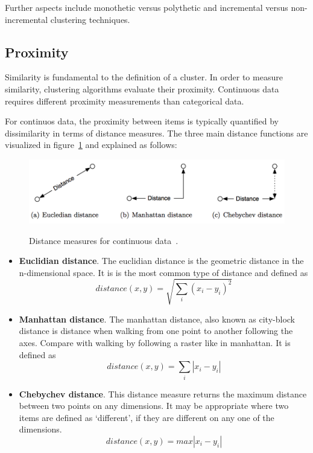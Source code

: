 Further aspects include monothetic versus polythetic and incremental versus non-incremental clustering techniques. 



\subsection{Proximity}
\label{chapter:proximity}

Similarity is fundamental to the definition of a cluster. In order to measure similarity, clustering algorithms evaluate their proximity. Continuous data requires different proximity measurements than categorical data.

For continuos data, the proximity between items is typically quantified by dissimilarity in terms of distance measures. The three main distance functions are visualized in figure~\ref{fig:distance} and explained as follows\cite{Meert06clustermaps}:

\begin{figure}[h]
  \begin{center}
    \includegraphics[width=1\textwidth]{figures/distance.png}
    \label{fig:distance}
    \caption{Distance measures for continuous data~\cite[p 12]{Meert06clustermaps}.}
  \end{center}
\end{figure}

\begin{itemize}

\item \textbf{Euclidian distance}. The euclidian distance is the geometric distance in the n-dimensional space. It is is the most common type of distance and defined as
\[ distance(x, y) = \sqrt{\sum_{i} (x_i - y_i)^2} \]

\item \textbf{Manhattan distance}. The manhattan distance, also known as city-block distance is distance when walking from one point to another following the axes. Compare with walking by following a raster like in manhattan. It is defined as
\[ distance(x, y) = \sum_{i} |x_i - y_i| \]

\item \textbf{Chebychev distance}. This distance measure returns the maximum distance between two points on any dimensions. It may be appropriate where two items are defined as `different', if they are different on any one of the dimensions.
\[ distance(x, y) = max |x_i - y_i| \]

\end{itemize}


